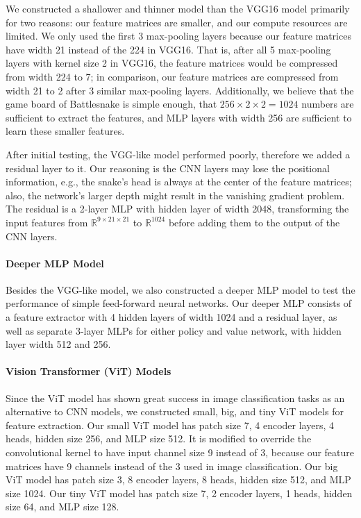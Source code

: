 \documentclass[conference]{IEEEtran}
\begin{document}
We constructed a shallower and thinner model than the VGG16 model primarily for
two reasons: our feature matrices are smaller,
and our compute resources are limited.
We only used the first 3 max-pooling layers because our feature matrices have
width 21 instead of the 224 in VGG16. That is,
after all 5 max-pooling layers with kernel size 2 in VGG16,
the feature matrices would be compressed from width 224 to 7; in comparison,
our feature matrices are compressed from width 21 to 2 after 3 similar
max-pooling layers.
Additionally, we believe that the game board of Battlesnake is simple enough,
that $256\times 2\times 2=1024$ numbers are sufficient to extract the features,
and MLP layers with width 256 are sufficient to learn these smaller features.

After initial testing, the VGG-like model performed poorly,
therefore we added a residual layer to it.
Our reasoning is the CNN layers may lose the positional information,
e.g., the snake's head is always at the center of the feature matrices;
also, the network's larger depth might result in the vanishing gradient problem.
The residual is a 2-layer MLP with hidden layer of width 2048,
transforming the input features from $\mathbb R^{9\times 21\times 21}$ to
$\mathbb R^{1024}$ before adding them to the output of the CNN layers.

\paragraph{Deeper MLP Model}
Besides the VGG-like model,
we also constructed a deeper MLP model to test the performance of simple
feed-forward neural networks.
Our deeper MLP consists of a feature extractor with 4 hidden layers of width
1024 and a residual layer,
as well as separate 3-layer MLPs for either policy and value network,
with hidden layer width 512 and 256.

\paragraph{Vision Transformer (ViT) Models}
Since the ViT model has shown great success in image classification tasks as an
alternative to CNN models,
we constructed small, big, and tiny ViT models for feature extraction.
Our small ViT model has patch size 7, 4 encoder layers, 4 heads, hidden size 256,
and MLP size 512.
It is modified to override the convolutional kernel to have input channel size 9
instead of 3,
because our feature matrices have 9 channels instead of the 3 used in image
classification.
Our big ViT model has patch size 3, 8 encoder layers, 8 heads, hidden size 512,
and MLP size 1024.
Our tiny ViT model has patch size 7, 2 encoder layers, 1 heads, hidden size 64,
and MLP size 128.
\end{document}
